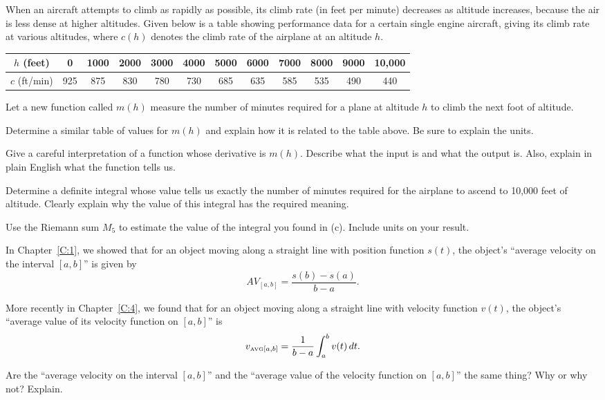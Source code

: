 \begin{exercises}
  \item When an aircraft attempts to climb as rapidly as
possible, its climb rate (in feet per minute) decreases as altitude
increases, because the air is less dense at higher altitudes.
Given below is a table showing performance data for a certain
single engine aircraft, giving its climb rate at various altitudes, where  $c(h)$ denotes the climb rate of the airplane at an altitude $h$.

\begingroup
\footnotesize
\begin{center}
  \begin{tabular}{|c||c|c|c|c|c|c|c|c|c|c|c|}
    \hline
    $h$ (feet)&0&1000&2000&3000&4000&5000&6000&7000&8000&9000&10,000\\
    \hline
    $c$ (ft/min)&925&875&830&780&730&685&635&585&535&490&440\\
    \hline
  \end{tabular}
\end{center}
\endgroup

 Let a new function called $m(h)$ measure
the number of minutes required for a plane at altitude $h$ to climb the
next foot of altitude.
\ba
	\item Determine a similar table of values for $m(h)$ and explain how it is related to the table above.  Be sure to explain the units.

	\item Give a careful interpretation of a function whose derivative
is $m(h)$.  Describe what the input is and what the output is.  Also,
explain in plain English what the function tells us.

	\item Determine a definite integral whose value tells us exactly the number of minutes required for the airplane to ascend to
10,000 feet of altitude.  Clearly explain why the value of this integral has the required meaning.

	\item Use the Riemann sum $M_5$ to estimate the value of the integral you found in (c).  Include units on your result.
\ea

  \item In Chapter~\ref{C:1}, we showed that for an object moving along a straight line with position function $s(t)$, the object's ``average velocity on the interval $[a,b]$'' is given by 
  $$\displaystyle AV_{[a,b]} =  \frac{s(b)-s(a)}{b-a}.$$
	
	More recently in Chapter~\ref{C:4}, we found that for an object moving along a straight line  with velocity function $v(t)$, the object's ``average value of its velocity function on $[a,b]$'' is 
	$$\displaystyle v_{\mbox{\tiny{AVG}}[a,b]}  = \frac{1}{b-a} \int_a^b v(t) \, dt.$$
	
Are the ``average velocity on the interval $[a,b]$'' and the ``average value of the velocity function on $[a,b]$'' the same thing?  Why or why not?  Explain.

\end{exercises}
\afterexercises
